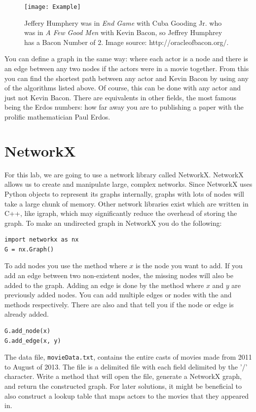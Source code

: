 \begin{figure}[h]
\texttt{[image: Example]}
\caption{Jeffery Humphery was in \emph{End Game} with Cuba Gooding Jr. who was in \emph{A Few Good Men} with Kevin Bacon, so Jeffrey Humphrey has a Bacon Number of 2.  Image source: http://oracleofbacon.org/.}
\end{figure}

You can define a graph in the same way: where each actor is a node and there is an edge between any two nodes if the actors were in a movie together. From this you can find the shortest path between any actor and Kevin Bacon by using any of the algorithms listed above. Of course, this can be done with any actor and just not Kevin Bacon. There are equivalents in other fields, the most famous being the Erdos numbers: how far away you are to publishing a paper with the prolific mathematician Paul Erdos.

\section*{NetworkX}
For this lab, we are going to use a network library called NetworkX. NetworkX allows us to create and manipulate large, complex networks.  Since NetworkX uses Python objects to represent its graphs internally, graphs with lots of nodes will take a large chunk of memory.  Other network libraries exist which are written in C++, like igraph, which may significantly reduce the overhead of storing the graph.
To make an undirected graph in NetworkX you do the following:
\begin{lstlisting}
import networkx as nx
G = nx.Graph()
\end{lstlisting}
To add nodes you use the  method where $x$ is the node you want to add.  If you add an edge between two non-existent nodes, the missing nodes will also be added to the graph. Adding an edge is done by the  method where $x$ and $y$ are previously added nodes. You can add multiple edges or nodes with the  and  methods respectively.  There are also  and  that tell you if the node or edge is already added.
\begin{lstlisting}
G.add_node(x)
G.add_edge(x, y)
\end{lstlisting}

\begin{problem}
The data file, \texttt{movieData.txt}, contains the entire casts of movies made from 2011 to August of 2013. The file is a delimited file with each field delimited by the '/' character.
Write a method that will open the file, generate a NetworkX graph, and return the constructed graph.
For later solutions, it might be beneficial to also construct a lookup table that maps actors to the movies that they appeared in.
\end{problem}

